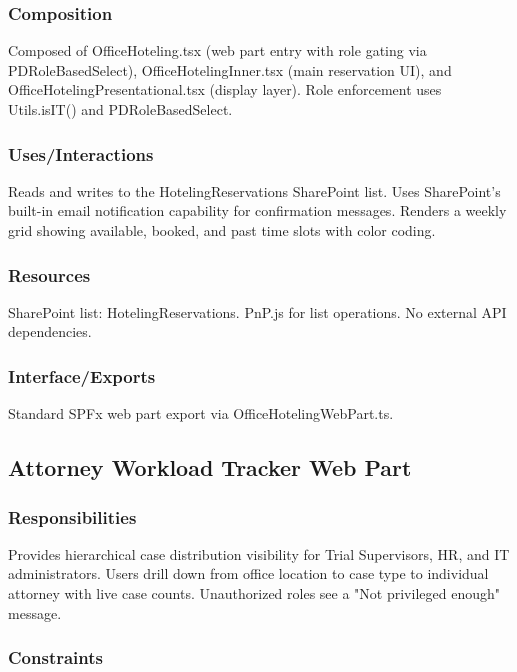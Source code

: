 \documentclass[12pt]{article}
\begin{document}
\subsubsection{Composition}

Composed of OfficeHoteling.tsx (web part entry with role gating via PDRoleBasedSelect), OfficeHotelingInner.tsx (main reservation UI), and OfficeHotelingPresentational.tsx (display layer). Role enforcement uses Utils.isIT() and PDRoleBasedSelect.

\subsubsection{Uses/Interactions}

Reads and writes to the HotelingReservations SharePoint list. Uses SharePoint's built-in email notification capability for confirmation messages. Renders a weekly grid showing available, booked, and past time slots with color coding.

\subsubsection{Resources}

SharePoint list: HotelingReservations. PnP.js for list operations. No external API dependencies.

\subsubsection{Interface/Exports}

Standard SPFx web part export via OfficeHotelingWebPart.ts.

\subsection{Attorney Workload Tracker Web Part}

\subsubsection{Responsibilities}

Provides hierarchical case distribution visibility for Trial Supervisors, HR, and IT administrators. Users drill down from office location to case type to individual attorney with live case counts. Unauthorized roles see a "Not privileged enough" message.

\subsubsection{Constraints}
\end{document}
